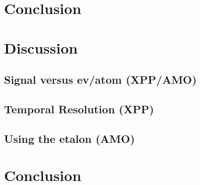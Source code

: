 \documentclass{article}
\begin{document}
\section{Conclusion}

\section{Discussion}
\subsection{Signal versus ev/atom (XPP/AMO)}
\subsection{Temporal Resolution (XPP)}
\subsection{Using the etalon (AMO)}

\section{Conclusion}




\end{document}
